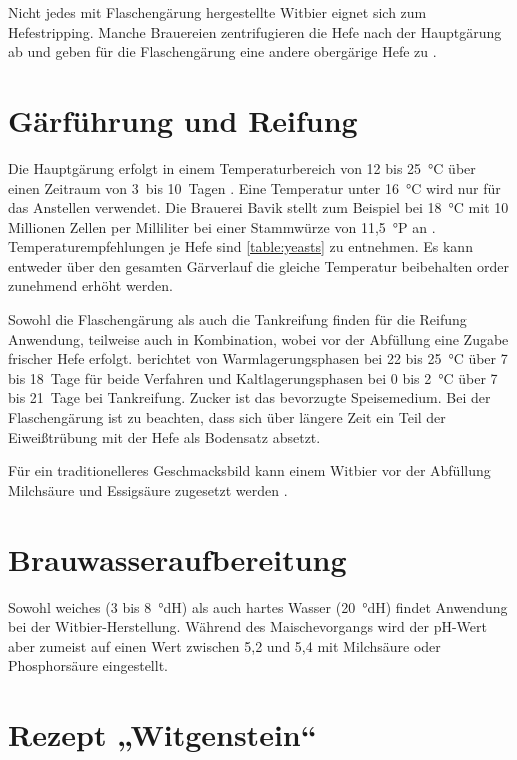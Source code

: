 \documentclass[a4paper,parskip=half]{scrartcl}
\begin{document}
Nicht jedes mit Flaschengärung hergestellte Witbier eignet sich zum
Hefestripping. Manche Brauereien zentrifugieren die Hefe nach
der Hauptgärung ab und geben für die Flaschengärung eine
andere obergärige Hefe zu \parencite[43]{Strottner1999}.

\section*{Gärführung und Reifung}

Die Hauptgärung erfolgt in einem Temperaturbereich von 12 bis 25~°C
über einen Zeitraum von 3~bis 10~Tagen \parencite[13,18]{Strottner1999}.
Eine Temperatur unter 16~°C wird nur für das Anstellen verwendet.
Die Brauerei Bavik stellt zum Beispiel bei 18~°C mit 10 Millionen Zellen
per Milliliter bei einer Stammwürze von 11,5~°P an \parencite[63]{Hieronymus2010}.
Temperaturempfehlungen je Hefe sind \autoref{table:yeasts} zu entnehmen.
Es kann entweder über den gesamten Gärverlauf die gleiche Temperatur
beibehalten order zunehmend erhöht werden.

Sowohl die Flaschengärung als auch die Tankreifung finden für die Reifung
Anwendung, teilweise auch in Kombination, wobei vor der Abfüllung eine
Zugabe frischer Hefe erfolgt. \citeauthor{Strottner1999} berichtet
von Warmlagerungsphasen bei 22 bis 25~°C über 7 bis 18~Tage für beide
Verfahren und Kaltlagerungsphasen bei 0 bis 2~°C über 7 bis 21~Tage
bei Tankreifung. Zucker ist das bevorzugte Speisemedium. Bei der Flaschengärung
ist zu beachten, dass sich über längere Zeit ein Teil der Eiweißtrübung
mit der Hefe als Bodensatz absetzt. \parencite[13\psq,18]{Strottner1999}

Für ein traditionelleres Geschmacksbild kann einem Witbier vor
der Abfüllung Milchsäure und Essigsäure zugesetzt werden
\parencite[18]{Strottner1999}.

\section*{Brauwasseraufbereitung}

Sowohl weiches (3 bis 8~°dH) als auch hartes Wasser (20~°dH) findet
Anwendung bei der Witbier-Herstellung. Während des Maischevorgangs
wird der pH-Wert aber zumeist auf einen Wert zwischen 5,2 und
5,4 mit Milchsäure oder Phosphorsäure eingestellt. \parencite[14]{Strottner1999}

\section*{Rezept „Witgenstein“}
\end{document}

